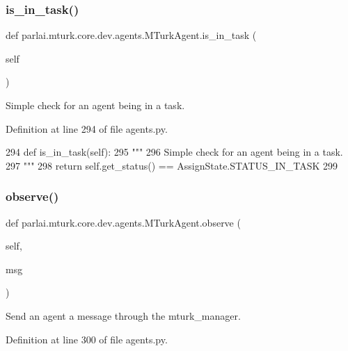 \subsubsection{\texorpdfstring{is\+\_\+in\+\_\+task()}{is\_in\_task()}}
{\footnotesize\ttfamily def parlai.\+mturk.\+core.\+dev.\+agents.\+M\+Turk\+Agent.\+is\+\_\+in\+\_\+task (\begin{DoxyParamCaption}\item[{}]{self }\end{DoxyParamCaption})}

\begin{DoxyVerb}Simple check for an agent being in a task.
\end{DoxyVerb}
 

Definition at line 294 of file agents.\+py.


\begin{DoxyCode}
294     \textcolor{keyword}{def }is\_in\_task(self):
295         \textcolor{stringliteral}{"""}
296 \textcolor{stringliteral}{        Simple check for an agent being in a task.}
297 \textcolor{stringliteral}{        """}
298         \textcolor{keywordflow}{return} self.get\_status() == AssignState.STATUS\_IN\_TASK
299 
\end{DoxyCode}
\mbox{\label{classparlai_1_1mturk_1_1core_1_1dev_1_1agents_1_1MTurkAgent_af54df523a8cda0a7ed82f7d1e2c5af4b}} 
\subsubsection{\texorpdfstring{observe()}{observe()}}
{\footnotesize\ttfamily def parlai.\+mturk.\+core.\+dev.\+agents.\+M\+Turk\+Agent.\+observe (\begin{DoxyParamCaption}\item[{}]{self,  }\item[{}]{msg }\end{DoxyParamCaption})}

\begin{DoxyVerb}Send an agent a message through the mturk_manager.
\end{DoxyVerb}
 

Definition at line 300 of file agents.\+py.


